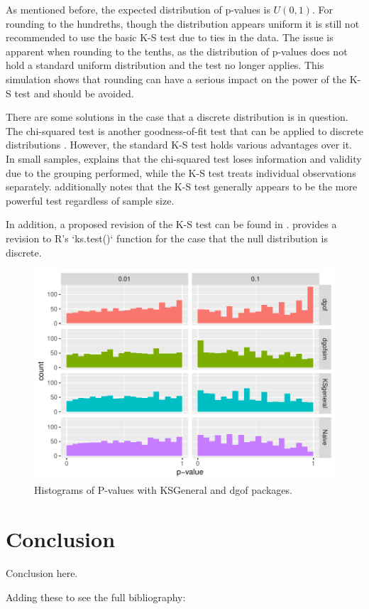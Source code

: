 \documentclass[12pt, letterpaper, titlepage]{article}
\begin{document}
As mentioned before, the expected distribution of p-values is $U(0,1)$. For rounding to the hundreths, though the distribution appears uniform it is still not recommended to use the basic K-S test due to ties in the data. The issue is apparent when rounding to the tenths, as the distribution of p-values does not hold a standard uniform distribution and the test no longer applies. This simulation shows that rounding can have a serious impact on the power of the K-S test and should be avoided.

There are some solutions in the case that a discrete distribution is in question. The chi-squared test is another goodness-of-fit test that can be applied to discrete distributions \citep{Massey}. However, the standard K-S test holds various advantages over it. In small samples, \citet{Massey} explains that the chi-squared test loses information and validity due to the grouping performed, while the K-S test treats individual observations separately. \citet{Massey} additionally notes that the K-S test generally appears to be the more powerful test regardless of sample size.

In addition, a proposed revision of the K-S test can be found in \citet{dgof}.\citet{dgof} provides a revision to R's `ks.test()` function for the case that the null distribution is discrete.

\begin{figure}[tbp]
  \centering
  \includegraphics{hist_general}
  \caption{Histograms of P-values with KSGeneral and dgof packages.}
  \label{fig:hist_general}
\end{figure}

\hypertarget{sec:conclusion}{%
\section{Conclusion}\label{sec:conclusion}}

Conclusion here.

Adding these to see the full bibliography: 

\citet{Steinskog}
\citet{Weiss}
\citet{Massey}
\citet{Lilliefors}
\citet{Arnold}
\citet{Conover}
\citet{Gleser}
\citet{Babu}
\citet{Butorina}
\citet{Racine}
\citet{Wang}
\citet{Capasso}
\citet{Dimitrova}



\end{document}

